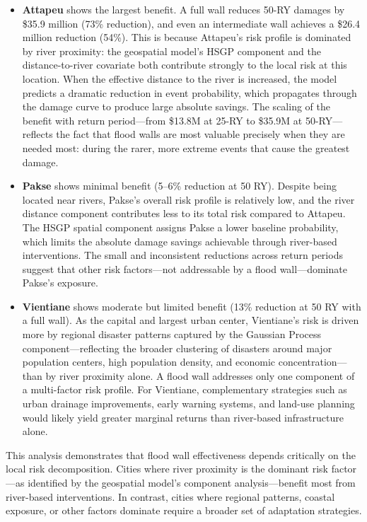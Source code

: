\documentclass[11pt,a4paper]{article}
\begin{document}
\begin{itemize}[leftmargin=2em]
  \item \textbf{Attapeu} shows the largest benefit. A full wall reduces 50-RY damages by \$35.9 million (73\% reduction), and even an intermediate wall achieves a \$26.4 million reduction (54\%). This is because Attapeu's risk profile is dominated by river proximity: the geospatial model's HSGP component and the distance-to-river covariate both contribute strongly to the local risk at this location. When the effective distance to the river is increased, the model predicts a dramatic reduction in event probability, which propagates through the damage curve to produce large absolute savings. The scaling of the benefit with return period---from \$13.8M at 25-RY to \$35.9M at 50-RY---reflects the fact that flood walls are most valuable precisely when they are needed most: during the rarer, more extreme events that cause the greatest damage.

  \item \textbf{Pakse} shows minimal benefit (5--6\% reduction at 50 RY). Despite being located near rivers, Pakse's overall risk profile is relatively low, and the river distance component contributes less to its total risk compared to Attapeu. The HSGP spatial component assigns Pakse a lower baseline probability, which limits the absolute damage savings achievable through river-based interventions. The small and inconsistent reductions across return periods suggest that other risk factors---not addressable by a flood wall---dominate Pakse's exposure.

  \item \textbf{Vientiane} shows moderate but limited benefit (13\% reduction at 50 RY with a full wall). As the capital and largest urban center, Vientiane's risk is driven more by regional disaster patterns captured by the Gaussian Process component---reflecting the broader clustering of disasters around major population centers, high population density, and economic concentration---than by river proximity alone. A flood wall addresses only one component of a multi-factor risk profile. For Vientiane, complementary strategies such as urban drainage improvements, early warning systems, and land-use planning would likely yield greater marginal returns than river-based infrastructure alone.
\end{itemize}

This analysis demonstrates that flood wall effectiveness depends critically on the local risk decomposition. Cities where river proximity is the dominant risk factor---as identified by the geospatial model's component analysis---benefit most from river-based interventions. In contrast, cities where regional patterns, coastal exposure, or other factors dominate require a broader set of adaptation strategies.
\end{document}
